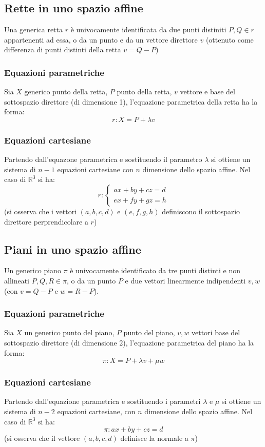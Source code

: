 \documentclass[a4paper]{article}
\begin{document}
\subsection{Rette in uno spazio affine}
Una generica retta \(r\) è univocamente identificata da due punti distiniti \(P, Q \in r\) appartenenti ad essa, o da un punto
e da un vettore direttore \(v\) (ottenuto come differenza di punti distinti della retta \(v = Q - P\))

\subsubsection*{Equazioni parametriche}
Sia \(X\) generico punto della retta, \(P\) punto della retta, \(v\) vettore e base del sottospazio direttore (di dimensione 1),
l'equazione parametrica della retta ha la forma:
\[r : X = P + \lambda v\]

\subsubsection*{Equazioni cartesiane}
Partendo dall'equazone parametrica e sostituendo il parametro \(\lambda\) si ottiene un sistema di \(n-1\) equazioni cartesiane
con \(n\) dimensione dello spazio affine. Nel caso di \(\mathbb{R}^3\) si ha:
\[r: \begin{cases}
	ax + by + cz = d \\
	ex + fy + gz = h
\end{cases}\]
(si osserva che i vettori \((a, b, c, d)\) e \((e, f, g, h)\) definiscono il sottospazio direttore perprendicolare a \(r\))

\subsection{Piani in uno spazio affine}
Un generico piano \(\pi\) è univocamente identificato da tre punti distinti e non allineati \(P, Q, R \in \pi\), o da un punto
\(P\) e due vettori linearmente indipendenti \(v, w\) (con \(v = Q-P\) e \(w = R-P\)).

\subsubsection*{Equazioni parametriche}
Sia \(X\) un generico punto del piano, \(P\) punto del piano, \(v, w\) vettori base del sottospazio direttore (di dimensione 2),
l'equazione parametrica del piano ha la forma:
\[\pi: X = P + \lambda v + \mu w\]

\subsubsection*{Equazioni cartesiane}
Partendo dall'equazione parametrica e sostituendo i parametri \(\lambda\) e \(\mu\) si ottiene un sistema di \(n-2\) equazioni
cartesiane, con \(n\) dimensione dello spazio affine. Nel caso di \(\mathbb{R}^3\) si ha:
\[\pi: ax + by + cz = d\]
(si osserva che il vettore \((a, b, c, d)\) definisce la normale a \(\pi\))
\end{document}
